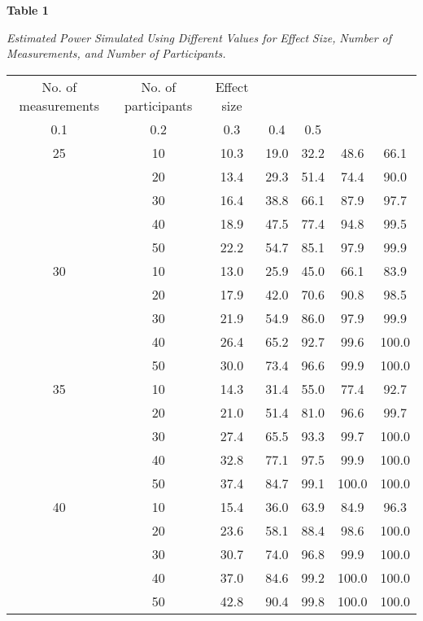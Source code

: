 \documentclass{article}
\begin{document}
\textbf{Table 1}

\emph{Estimated }\emph{P}\emph{ower }\emph{S}\emph{imulated }\emph{U}\emph{sing }\emph{D}\emph{ifferent }\emph{V}\emph{alues for }\emph{E}\emph{ffect }\emph{S}\emph{ize, }\emph{N}\emph{umber of }\emph{M}\emph{easurements, and }\emph{N}\emph{umber of }\emph{P}\emph{articipants.}


\begin{table}

  
\begin{tabular}{c  c  c  c  c  c  c}

  No. of measurements & No. of participants & Effect size\\
0.1 & 0.2 & 0.3 & 0.4 & 0.5\\
25 & 10 & 10.3 & 19.0 & 32.2 & 48.6 & 66.1\\
  & 20 & 13.4 & 29.3 & 51.4 & 74.4 & 90.0\\
  & 30 & 16.4 & 38.8 & 66.1 & 87.9 & 97.7\\
  & 40 & 18.9 & 47.5 & 77.4 & 94.8 & 99.5\\
  & 50 & 22.2 & 54.7 & 85.1 & 97.9 & 99.9\\
30 & 10 & 13.0 & 25.9 & 45.0 & 66.1 & 83.9\\
  & 20 & 17.9 & 42.0 & 70.6 & 90.8 & 98.5\\
  & 30 & 21.9 & 54.9 & 86.0 & 97.9 & 99.9\\
  & 40 & 26.4 & 65.2 & 92.7 & 99.6 & 100.0\\
  & 50 & 30.0 & 73.4 & 96.6 & 99.9 & 100.0\\
35 & 10 & 14.3 & 31.4 & 55.0 & 77.4 & 92.7\\
  & 20 & 21.0 & 51.4 & 81.0 & 96.6 & 99.7\\
  & 30 & 27.4 & 65.5 & 93.3 & 99.7 & 100.0\\
  & 40 & 32.8 & 77.1 & 97.5 & 99.9 & 100.0\\
  & 50 & 37.4 & 84.7 & 99.1 & 100.0 & 100.0\\
40 & 10 & 15.4 & 36.0 & 63.9 & 84.9 & 96.3\\
  & 20 & 23.6 & 58.1 & 88.4 & 98.6 & 100.0\\
  & 30 & 30.7 & 74.0 & 96.8 & 99.9 & 100.0\\
  & 40 & 37.0 & 84.6 & 99.2 & 100.0 & 100.0\\
  & 50 & 42.8 & 90.4 & 99.8 & 100.0 & 100.0\\


\end{tabular}


\end{table}
\end{document}
